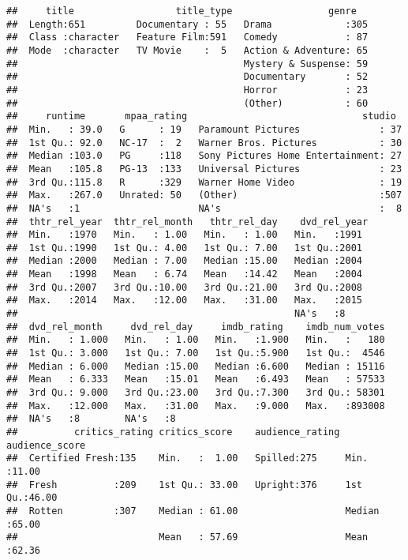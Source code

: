 \documentclass[]{article}
\begin{document}
\begin{verbatim}
##     title                  title_type                 genre    
##  Length:651         Documentary : 55   Drama             :305  
##  Class :character   Feature Film:591   Comedy            : 87  
##  Mode  :character   TV Movie    :  5   Action & Adventure: 65  
##                                        Mystery & Suspense: 59  
##                                        Documentary       : 52  
##                                        Horror            : 23  
##                                        (Other)           : 60  
##     runtime       mpaa_rating                               studio   
##  Min.   : 39.0   G      : 19   Paramount Pictures              : 37  
##  1st Qu.: 92.0   NC-17  :  2   Warner Bros. Pictures           : 30  
##  Median :103.0   PG     :118   Sony Pictures Home Entertainment: 27  
##  Mean   :105.8   PG-13  :133   Universal Pictures              : 23  
##  3rd Qu.:115.8   R      :329   Warner Home Video               : 19  
##  Max.   :267.0   Unrated: 50   (Other)                         :507  
##  NA's   :1                     NA's                            :  8  
##  thtr_rel_year  thtr_rel_month   thtr_rel_day    dvd_rel_year 
##  Min.   :1970   Min.   : 1.00   Min.   : 1.00   Min.   :1991  
##  1st Qu.:1990   1st Qu.: 4.00   1st Qu.: 7.00   1st Qu.:2001  
##  Median :2000   Median : 7.00   Median :15.00   Median :2004  
##  Mean   :1998   Mean   : 6.74   Mean   :14.42   Mean   :2004  
##  3rd Qu.:2007   3rd Qu.:10.00   3rd Qu.:21.00   3rd Qu.:2008  
##  Max.   :2014   Max.   :12.00   Max.   :31.00   Max.   :2015  
##                                                 NA's   :8     
##  dvd_rel_month     dvd_rel_day     imdb_rating    imdb_num_votes  
##  Min.   : 1.000   Min.   : 1.00   Min.   :1.900   Min.   :   180  
##  1st Qu.: 3.000   1st Qu.: 7.00   1st Qu.:5.900   1st Qu.:  4546  
##  Median : 6.000   Median :15.00   Median :6.600   Median : 15116  
##  Mean   : 6.333   Mean   :15.01   Mean   :6.493   Mean   : 57533  
##  3rd Qu.: 9.000   3rd Qu.:23.00   3rd Qu.:7.300   3rd Qu.: 58301  
##  Max.   :12.000   Max.   :31.00   Max.   :9.000   Max.   :893008  
##  NA's   :8        NA's   :8                                       
##          critics_rating critics_score    audience_rating audience_score 
##  Certified Fresh:135    Min.   :  1.00   Spilled:275     Min.   :11.00  
##  Fresh          :209    1st Qu.: 33.00   Upright:376     1st Qu.:46.00  
##  Rotten         :307    Median : 61.00                   Median :65.00  
##                         Mean   : 57.69                   Mean   :62.36  

\end{verbatim}
\end{document}
